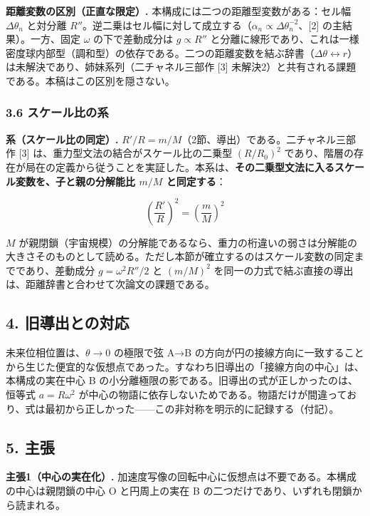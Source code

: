 \documentclass[
  a4paper,
]{ltjsarticle}
\begin{document}
\textbf{距離変数の区別（正直な限定）.}
本構成には二つの距離型変数がある：セル幅 \(\Delta\theta_n\) と対分離
\(R''\)。逆二乗はセル幅に対して成立する（\(\alpha_n\propto\Delta\theta_n^{-2}\)、{[}2{]}
の主結果）。一方、固定 \(\omega\) の下で差動成分は \(g\propto R''\)
と分離に線形であり、これは一様密度球内部型（調和型）の依存である。二つの距離変数を結ぶ辞書（\(\Delta\theta\leftrightarrow r\)）は未解決であり、姉妹系列（二チャネル三部作
{[}3{]} 未解決2）と共有される課題である。本稿はこの区別を隠さない。

\subsubsection{3.6
スケール比の系}\label{ux30b9ux30b1ux30fcux30ebux6bd4ux306eux7cfb}

\textbf{系（スケール比の同定）.}
\(R'/R=m/M\)（2節、導出）である。二チャネル三部作 {[}3{]}
は、重力型文法の結合がスケール比の二乗型 \((R/R_0)^2\)
であり、階層の存在が局在の定義から従うことを実証した。本系は、\textbf{その二乗型文法に入るスケール変数を、子と親の分解能比
\(m/M\) と同定する}：

\[
\left(\frac{R'}{R}\right)^2=\left(\frac{m}{M}\right)^2
\]

\(M\)
が親閉鎖（宇宙規模）の分解能であるなら、重力の桁違いの弱さは分解能の大きさそのものとして読める。ただし本節が確立するのはスケール変数の同定までであり、差動成分
\(g=\omega^2R''/2\) と \((m/M)^2\)
を同一の力式で結ぶ直接の導出は、距離辞書と合わせて次論文の課題である。

\subsection{4.
旧導出との対応}\label{ux65e7ux5c0eux51faux3068ux306eux5bfeux5fdc}

未来位相位置は、\(\theta\to0\) の極限で弦 A→B
の方向が円の接線方向に一致することから生じた便宜的な仮想点であった。すなわち旧導出の「接線方向の中心」は、本構成の実在中心
B の小分離極限の影である。旧導出の式が正しかったのは、恒等式
\(a=R\omega^2\)
が中心の物語に依存しないためである。物語だけが間違っており、式は最初から正しかった------この非対称を明示的に記録する（付記）。

\subsection{5. 主張}\label{ux4e3bux5f35}

\textbf{主張1（中心の実在化）.}
加速度写像の回転中心に仮想点は不要である。本構成の中心は親閉鎖の中心 O
と円周上の実在 B の二つだけであり、いずれも閉鎖から読まれる。
\end{document}
